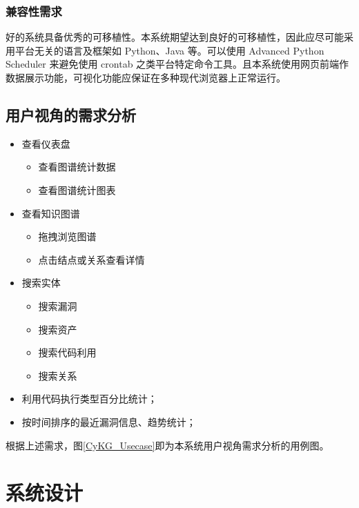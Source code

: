 \documentclass[a4paper,AutoFakeBold,oneside,12pt]{book}
\begin{document}
\subsection{兼容性需求}

好的系统具备优秀的可移植性。本系统期望达到良好的可移植性，因此应尽可能采用平台无关的语言及框架如 Python、Java 等。可以使用 Advanced Python Scheduler 来避免使用 crontab 之类平台特定命令工具。且本系统使用网页前端作数据展示功能，可视化功能应保证在多种现代浏览器上正常运行。

\section{用户视角的需求分析}

\begin{itemize}
	\item 查看仪表盘
	      \begin{itemize}
		      \item 查看图谱统计数据
		      \item 查看图谱统计图表
	      \end{itemize}
	\item 查看知识图谱
	      \begin{itemize}
		      \item 拖拽浏览图谱
		      \item 点击结点或关系查看详情
	      \end{itemize}
	\item 搜索实体
	      \begin{itemize}
		      \item 搜索漏洞
		      \item 搜索资产
		      \item 搜索代码利用
		      \item 搜索关系
	      \end{itemize}
	\item 利用代码执行类型百分比统计；
	\item 按时间排序的最近漏洞信息、趋势统计；
\end{itemize}

根据上述需求，图\ref{CyKG_Usecase}即为本系统用户视角需求分析的用例图。


\chapter{系统设计}
\end{document}
